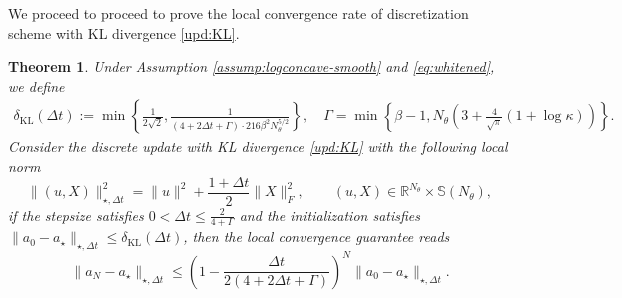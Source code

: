 \documentclass[11pt]{article}
\theoremstyle{plain}
\newtheorem{theorem}{Theorem}[section]
\theoremstyle{definition}
\theoremstyle{remark}
\newcommand{\R}{\mathbb{R}}
\newcommand{\Sym}{\mathbb{S}}
\begin{document}
We proceed to proceed to prove the local convergence rate of discretization scheme with KL divergence \eqref{upd:KL}.

\begin{theorem}
    Under Assumption \ref{assump:logconcave-smooth} and \eqref{eq:whitened}, we define
    \begin{align*}
        \delta_\mathrm{KL} (\Delta t) := \min \left\{ \frac{1}{2\sqrt{2}}, \frac{1}{(4 + 2 \Delta t + \Gamma) \cdot 216 \beta^2 N_\theta^{5/2}} \right\},\quad
        \Gamma = \min \left\{ \beta - 1, N_\theta \left( 3 + \frac{4}{\sqrt{\pi}} (1 + \log \kappa) \right) \right\}.
    \end{align*}
    Consider the discrete update with KL divergence \eqref{upd:KL} with the following local norm
    \begin{equation*}
        \|(u, X)\|_{\star, \Delta t}^2 = \|u\|^2 + \frac{1 + \Delta t}{2} \|X\|_F^2, \qquad (u, X) \in \R^{N_\theta} \times \Sym(N_\theta),
    \end{equation*}
    if the stepsize satisfies $0 < \Delta t \leq \frac{2}{4 + \Gamma}$ and the initialization satisfies $\|a_0 - a_\star\|_{\star, \Delta t} \leq \delta_{\mathrm{KL}} (\Delta t)$, then the local convergence guarantee reads
    \begin{equation*}
        \|a_N - a_\star\|_{\star, \Delta t} \leq \left( 1 - \frac{\Delta t}{2 (4 + 2 \Delta t + \Gamma)} \right)^N \|a_0 - a_\star\|_{\star, \Delta t}.
    \end{equation*}
\end{theorem}
\end{document}
